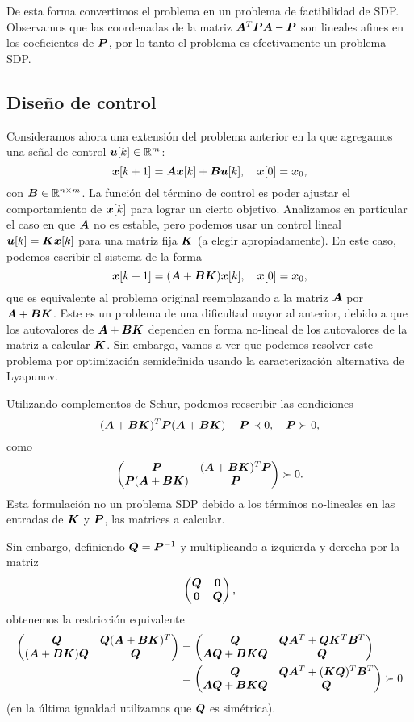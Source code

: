 De esta forma convertimos el problema en un problema de factibilidad de SDP. Observamos que las coordenadas de la matriz $\bm{A}^T \bm{P} \bm{A} - \bm{P}$ son lineales afines en los coeficientes de $\bm{P}$, por lo tanto el problema es efectivamente un problema SDP.

\subsection{Diseño de control}
Consideramos ahora una extensión del problema anterior en la que agregamos una señal de control $\bm{u}[k] \in \mathbb{R}^{m}$:
$$
\bm{x}[k+1] = \bm{A}\bm{x}[k] + \bm{B}\bm{u}[k], \quad \bm{x}[0] = \bm{x}_0,
$$
con $\bm{B} \in \mathbb{R}^{n \times m}$. La función del término de control es poder ajustar el comportamiento de $\bm{x}[k]$ para lograr un cierto objetivo. Analizamos en particular el caso en que $\bm{A}$ no es estable, pero podemos usar un control lineal $\bm{u}[k] = \bm{K}\bm{x}[k]$ para una matriz fija $\bm{K}$ (a elegir apropiadamente). En este caso, podemos escribir el sistema de la forma
$$
\bm{x}[k+1] = (\bm{A} + \bm{B}\bm{K})\bm{x}[k], \quad \bm{x}[0] = \bm{x}_0,
$$
que es equivalente al problema original reemplazando a la matriz $\bm{A}$ por $\bm{A}+\bm{B}\bm{K}$. Este es un problema de una dificultad mayor al anterior, debido a que los autovalores de $\bm{A} + \bm{B}\bm{K}$ dependen en forma no-lineal de los autovalores de la matriz a calcular $\bm{K}$. Sin embargo, vamos a ver que podemos resolver este problema por optimización semidefinida usando la caracterización alternativa de Lyapunov.

Utilizando complementos de Schur, podemos reescribir las condiciones
$$
(\bm{A}+\bm{B}\bm{K})^T \bm{P} (\bm{A} + \bm{B}\bm{K}) - \bm{P} \prec 0, \quad \bm{P} \succ 0,
$$
como
$$
\begin{pmatrix}
\bm{P} & (\bm{A}+\bm{B}\bm{K})^T \bm{P} \\
\bm{P}(\bm{A}+\bm{B}\bm{K}) & \bm{P}
\end{pmatrix} \succ 0.
$$
Esta formulación no un problema SDP debido a los términos no-lineales en las entradas de  $\bm{K}$ y $\bm{P}$, las matrices a calcular.

Sin embargo, definiendo $\bm{Q} = \bm{P}^{-1}$ y multiplicando a izquierda y derecha por la matriz
$$
\begin{pmatrix}
\bm{Q} & \bm{0}  \\
\bm{0} & \bm{Q}
\end{pmatrix},
$$
obtenemos la restricción equivalente
$$\begin{aligned}
\begin{pmatrix}
\bm{Q} & \bm{Q}(\bm{A}+\bm{B}\bm{K})^T  \\
(\bm{A} + \bm{B}\bm{K})\bm{Q} & \bm{Q}
\end{pmatrix} &=
\begin{pmatrix}
\bm{Q} & \bm{Q}\bm{A}^T + \bm{Q}\bm{K}^T\bm{B}^T  \\
\bm{A}\bm{Q} + \bm{B}\bm{K}\bm{Q} & \bm{Q}
\end{pmatrix} \\
&=
\begin{pmatrix}
\bm{Q} & \bm{Q}\bm{A}^T + (\bm{K}\bm{Q})^T\bm{B}^T  \\
\bm{A}\bm{Q} + \bm{B}\bm{K}\bm{Q} & \bm{Q}
\end{pmatrix} \succ 0
\end{aligned}
$$
(en la última igualdad utilizamos que $\bm{Q}$ es simétrica).


